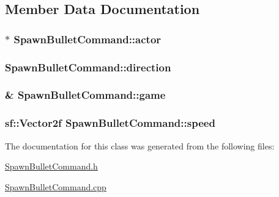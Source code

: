 \subsection{Member Data Documentation}
\hypertarget{class_spawn_bullet_command_a36d5fec5d82d09a70954be0fb1fe519f}{}
\subsubsection[{actor}]{$\ast$ Spawn\+Bullet\+Command\+::actor\hspace{0.3cm}{\ttfamily [protected]}}\label{class_spawn_bullet_command_a36d5fec5d82d09a70954be0fb1fe519f}
\hypertarget{class_spawn_bullet_command_a7d2d824d68a8df88aec7b86500c27a13}{}
\subsubsection[{direction}]{ Spawn\+Bullet\+Command\+::direction\hspace{0.3cm}{\ttfamily [private]}}\label{class_spawn_bullet_command_a7d2d824d68a8df88aec7b86500c27a13}
\hypertarget{class_spawn_bullet_command_a9e98531440220e01f46fb91b3fa78cef}{}
\subsubsection[{game}]{\& Spawn\+Bullet\+Command\+::game\hspace{0.3cm}{\ttfamily [private]}}\label{class_spawn_bullet_command_a9e98531440220e01f46fb91b3fa78cef}
\hypertarget{class_spawn_bullet_command_a5f302f0a55b2e9102e16f7ff9eec9396}{}
\subsubsection[{speed}]{\setlength{\rightskip}{0pt plus 5cm}sf\+::\+Vector2f Spawn\+Bullet\+Command\+::speed\hspace{0.3cm}{\ttfamily [protected]}}\label{class_spawn_bullet_command_a5f302f0a55b2e9102e16f7ff9eec9396}


The documentation for this class was generated from the following files\+:\begin{DoxyCompactItemize}
\item 
\hyperlink{_spawn_bullet_command_8h}{Spawn\+Bullet\+Command.\+h}\item 
\hyperlink{_spawn_bullet_command_8cpp}{Spawn\+Bullet\+Command.\+cpp}\end{DoxyCompactItemize}
